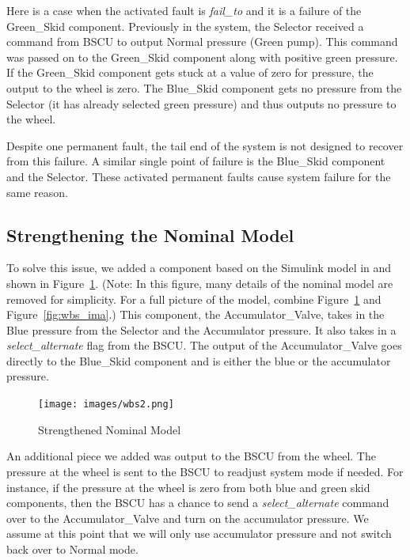 Here is a case when the activated fault is \textit{fail\_to} and it is a failure of the Green\_Skid component. Previously in the system, the Selector received a command from BSCU to output Normal pressure (Green pump). This command was passed on to the Green\_Skid component along with positive green pressure. If the Green\_Skid component gets stuck at a value of zero for pressure, the output to the wheel is zero. The Blue\_Skid component gets no pressure from the Selector (it has already selected green pressure) and thus outputs no pressure to the wheel. 

Despite one permanent fault, the tail end of the system is not designed to recover from this failure. A similar single point of failure is the Blue\_Skid component and the Selector. These activated permanent faults cause system failure for the same reason. 

\subsection{Strengthening the Nominal Model}
To solve this issue, we added a component based on the Simulink model in \cite{Joshi05:Dasc} and shown in Figure~\ref{fig:new_components}. (Note: In this figure, many details of the nominal model are removed for simplicity. For a full picture of the model, combine Figure~\ref{fig:new_components} and Figure~\ref{fig:wbs_ima}.) This component, the Accumulator\_Valve, takes in the Blue pressure from the Selector and the Accumulator pressure. It also takes in a \textit{select\_alternate} flag from the BSCU. The output of the Accumulator\_Valve goes directly to the Blue\_Skid component and is either the blue or the accumulator pressure. 

\begin{figure}[h!]
  \centering
 \texttt{[image: images/wbs2.png]}
  \vspace{-0.1in}
  \caption{Strengthened Nominal Model}
  \label{fig:new_components}
\end{figure}

An additional piece we added was output to the BSCU from the wheel. The pressure at the wheel is sent to the BSCU to readjust system mode if needed. For instance, if the pressure at the wheel is zero from both blue and green skid components, then the BSCU has a chance to send a \textit{select\_alternate} command over to the Accumulator\_Valve and turn on the accumulator pressure. We assume at this point that we will only use accumulator pressure and not switch back over to Normal mode. 

